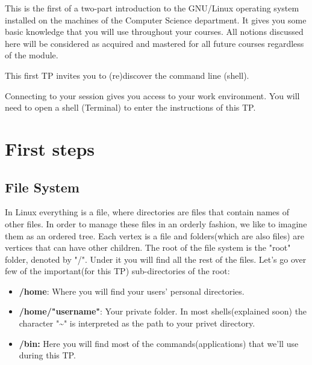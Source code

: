 \documentclass[11pt]{article}
\newcommand{\numtd}{01}
\newcommand{\titretd}{The command line in Linux}
\begin{document}
\entete{\numtd}{\titretd}

\begin{introduction}
	This is the first of a two-part introduction to the GNU/Linux operating system installed on the machines of the Computer Science department. 
	It gives you some basic knowledge that you will use throughout your courses. All notions discussed here will be considered as acquired and mastered for all future courses regardless of the module.
	
	\noindent This first TP invites you to (re)discover the command line (shell).
	
	
	\noindent Connecting to your session gives you access to your work environment. You will need to open a shell (Terminal) to enter the instructions of this TP.	
	
	
\end{introduction}


\section{First steps}
\subsection{File System}
In Linux everything is a file, where directories are files that contain names of other files. In order to manage these files in an orderly fashion, we like to imagine them as an ordered tree. Each vertex is a file and folders(which are also files) are vertices that can have other children.
The root of the file system is the "root" folder, denoted by "/". Under it you will find all the rest of the files. Let's go over few of the important(for this TP) sub-directories of the root:

\begin{itemize}
	\item {\bf /home}: Where you will find your users’ personal directories.
	\item {\bf /home/"username"}: Your private folder. In most shells(explained soon) the character "\textasciitilde" is interpreted as the path to your privet directory. 
	\item {\bf /bin:} Here you will find most of the commands(applications) that we'll use during this TP.
	
\end{itemize}
\end{document}
